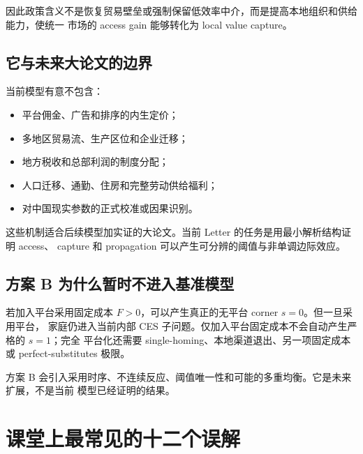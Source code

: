 \documentclass[UTF8,11pt,scheme=chinese,fontset=fandol]{ctexart}
\theoremstyle{definition}
\begin{document}
因此政策含义不是恢复贸易壁垒或强制保留低效率中介，而是提高本地组织和供给能力，使统一
市场的 access gain 能够转化为 local value capture。

\subsection{它与未来大论文的边界}

当前模型有意不包含：
\begin{itemize}
  \item 平台佣金、广告和排序的内生定价；
  \item 多地区贸易流、生产区位和企业迁移；
  \item 地方税收和总部利润的制度分配；
  \item 人口迁移、通勤、住房和完整劳动供给福利；
  \item 对中国现实参数的正式校准或因果识别。
\end{itemize}

这些机制适合后续模型加实证的大论文。当前 Letter 的任务是用最小解析结构证明 access、
capture 和 propagation 可以产生可分辨的阈值与非单调边际效应。

\subsection{方案 B 为什么暂时不进入基准模型}

若加入平台采用固定成本 \(F>0\)，可以产生真正的无平台 corner \(s=0\)。但一旦采用平台，
家庭仍进入当前内部 CES 子问题。仅加入平台固定成本不会自动产生严格的 \(s=1\)；完全
平台化还需要 single-homing、本地渠道退出、另一项固定成本或 perfect-substitutes 极限。

方案 B 会引入采用时序、不连续反应、阈值唯一性和可能的多重均衡。它是未来扩展，不是当前
模型已经证明的结果。

\section{课堂上最常见的十二个误解}
\end{document}
